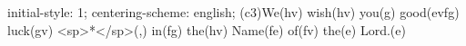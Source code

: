 initial-style: 1;
centering-scheme: english;
(c3)We(hv) wish(hv) you(g) good(evfg) luck(gv) <sp>*</sp>(,) in(fg) the(hv) Name(fe) of(fv) the(e) Lord.(e)
